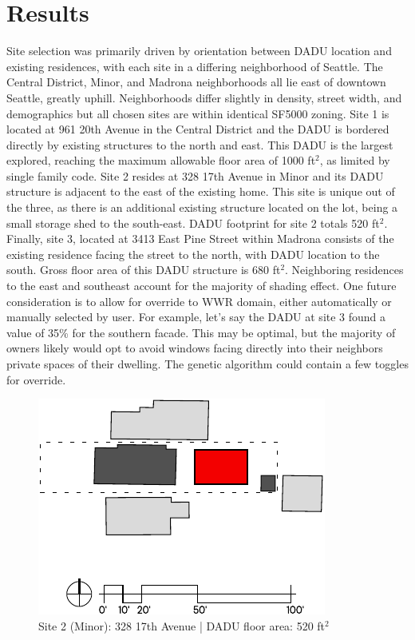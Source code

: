 \documentclass[sagev,times,Review,doublespace]{sagej}
\begin{document}
\section{Results}
Site selection was primarily driven by orientation between DADU location and existing residences, with each site in a differing neighborhood of Seattle. The Central District, Minor, and Madrona neighborhoods all lie east of downtown Seattle, greatly uphill. Neighborhoods differ slightly in density, street width, and demographics but all chosen sites are within identical SF5000 zoning. Site 1 is located at 961 20th Avenue in the Central District and the DADU is bordered directly by existing structures to the north and east. This DADU is the largest explored, reaching the maximum allowable floor area of 1000 ft$^2$, as limited by single family code\cite{ADUniverseADURules}. Site 2 resides at 328 17th Avenue in Minor and its DADU structure is adjacent to the east of the existing home. This site is unique out of the three, as there is an additional existing structure located on the lot, being a small storage shed to the south-east. DADU footprint for site 2 totals 520 ft$^2$. Finally, site 3, located at 3413 East Pine Street within Madrona consists of the existing residence facing the street to the north, with DADU location to the south. Gross floor area of this DADU structure is 680 ft$^2$. Neighboring residences to the east and southeast account for the majority of shading effect. One future consideration is to allow for override to WWR domain, either automatically or manually selected by user. For example, let's say the DADU at site 3 found a value of 35\% for the southern facade. This may be optimal, but the majority of owners likely would opt to avoid windows facing directly into their neighbors private spaces of their dwelling. The genetic algorithm could contain a few toggles for override.

\begin{figure}[h!]
\centering
\includegraphics{site2.pdf}
\caption{Site 2 (Minor): 328 17th Avenue | DADU floor area: 520 ft$^2$}
\label{site2-plan}
\end{figure}
\end{document}
